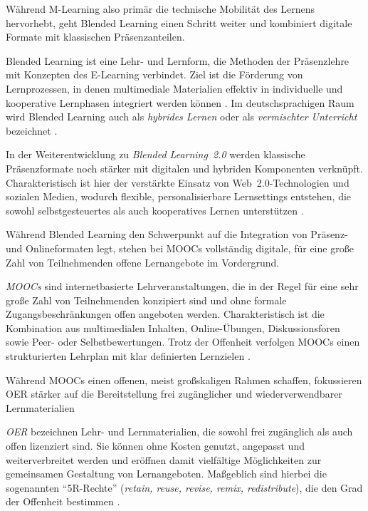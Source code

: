 Während M-Learning also primär die technische Mobilität des Lernens hervorhebt, geht Blended Learning einen Schritt weiter und kombiniert digitale Formate mit klassischen Präsenzanteilen.

Blended Learning ist eine Lehr- und Lernform, die Methoden der Präsenzlehre mit Konzepten des E-Learning verbindet. Ziel ist die Förderung von Lernprozessen, in denen multimediale Materialien effektiv in individuelle und kooperative Lernphasen integriert werden können \parencite[S.~74]{magenheim_blended_2003}. Im deutschsprachigen Raum wird Blended Learning auch als \textit{hybrides Lernen} oder als \textit{vermischter Unterricht} bezeichnet \parencite[S.~29]{pfeiffer_simulationsumgebungen_2008}.

In der Weiterentwicklung zu \textit{Blended Learning~2.0} werden klassische Präsenzformate noch stärker mit digitalen und hybriden Komponenten verknüpft. Charakteristisch ist hier der verstärkte Einsatz von Web~2.0-Technologien und sozialen Medien, wodurch flexible, personalisierbare Lernsettings entstehen, die sowohl selbstgesteuertes als auch kooperatives Lernen unterstützen \parencites{seufert_schulleitertagung_2014}{news_aktuell_gmbh_e-learning_2025}.

Während Blended Learning den Schwerpunkt auf die Integration von Präsenz- und Onlineformaten legt, stehen bei \ac{MOOC}s vollständig digitale, für eine große Zahl von Teilnehmenden offene Lernangebote im Vordergrund.

\textit{\ac{MOOC}s} sind internetbasierte Lehrveranstaltungen, die in der Regel für eine sehr große Zahl von Teilnehmenden konzipiert sind und ohne formale Zugangsbeschränkungen offen angeboten werden. Charakteristisch ist die Kombination aus multimedialen Inhalten, Online-Übungen, Diskussionsforen sowie Peer- oder Selbstbewertungen. Trotz der Offenheit verfolgen MOOCs einen strukturierten Lehrplan mit klar definierten Lernzielen \parencites[S.~5]{yuan_moocs_2013}[S.~204]{liyanagunawardena_moocs_2013}.

Während \ac{MOOC}s einen offenen, meist großskaligen Rahmen schaffen, fokussieren \ac{OER} stärker auf die Bereitstellung frei zugänglicher und wiederverwendbarer Lernmaterialien

\textit{\ac{OER}} bezeichnen Lehr- und Lernmaterialien, die sowohl frei zugänglich als auch offen lizenziert sind. Sie können ohne Kosten genutzt, angepasst und weiterverbreitet werden und eröffnen damit vielfältige Möglichkeiten zur gemeinsamen Gestaltung von Lernangeboten. Maßgeblich sind hierbei die sogenannten \enquote{5R-Rechte} (\textit{retain, reuse, revise, remix, redistribute}), die den Grad der Offenheit bestimmen \parencite[S.~134f]{wiley_defining_2018}.

